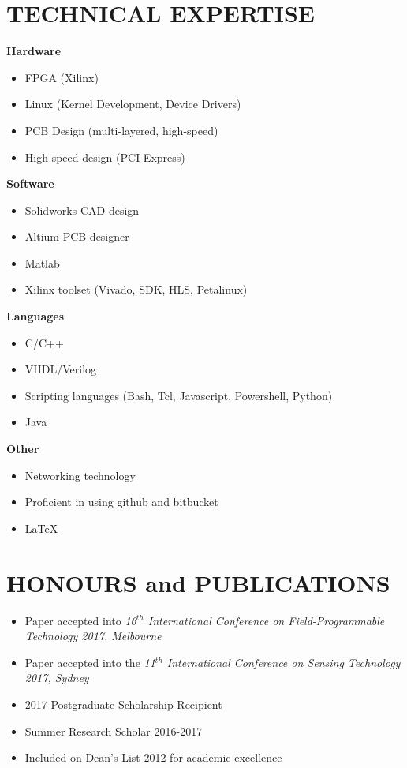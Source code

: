 \documentclass[3pt]{res}
\begin{document}
\begin{resume}
      
 
\section{TECHNICAL EXPERTISE} 
{\bf Hardware} 
    \begin{itemize}[noitemsep]
    	\item FPGA (Xilinx)
    	\item Linux (Kernel Development, Device Drivers) 
    	\item PCB Design (multi-layered, high-speed)
    	\item High-speed design (PCI Express)
    \end{itemize}
 {\bf Software} 
    \begin{itemize}[noitemsep]
    	\item Solidworks CAD design
    	\item Altium PCB designer
    	\item Matlab
    	\item Xilinx toolset (Vivado, SDK, HLS, Petalinux) 
    \end{itemize}
{\bf Languages} 
    \begin{itemize}[noitemsep]
    	\item C/C++
    	\item VHDL/Verilog
    	\item Scripting languages (Bash, Tcl, Javascript, Powershell, Python)
    	\item Java
    \end{itemize}
    
{\bf Other} 
    \begin{itemize}[noitemsep]
     	\item Networking technology
    	\item Proficient in using github and bitbucket
    	\item \LaTeX
    \end{itemize}

\section{HONOURS and PUBLICATIONS} 
\begin{itemize}[noitemsep]
		\item Paper accepted into \textit{16$^{th}$ International Conference on Field-Programmable Technology 2017, Melbourne}
		\item Paper accepted into the \textit{11$^{th}$ International Conference on Sensing Technology 2017, Sydney}
		\item 2017 Postgraduate Scholarship Recipient
		\item Summer Research Scholar 2016-2017
    	\item Included on Dean's List 2012 for academic excellence
    \end{itemize}
\end{resume}
%
%
\end{document}
